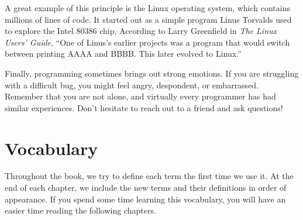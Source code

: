 
A great example of this principle is the Linux operating system, which contains millions of lines of code.
It started out as a simple program Linus Torvalds used to explore the Intel 80386 chip.
According to Larry Greenfield in {\it The Linux Users' Guide}, ``One of Linus's earlier projects was a program that would switch between printing AAAA and BBBB.
This later evolved to Linux.''


Finally, programming sometimes brings out strong emotions.
If you are struggling with a difficult bug, you might feel angry, despondent, or embarrassed.
Remember that you are not alone, and virtually every programmer has had similar experiences.
Don't hesitate to reach out to a friend and ask questions!



\section{Vocabulary}

Throughout the book, we try to define each term the first time we use it.
At the end of each chapter, we include the new terms and their definitions in order of appearance.
If you spend some time learning this vocabulary, you will have an easier time reading the following chapters.

